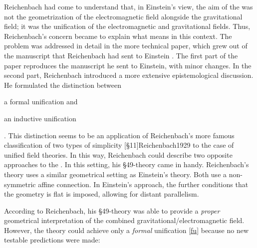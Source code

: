 \documentclass[draft]{article}
\begin{document}
Reichenbach had come to understand that, in Einstein's view, the aim of the \uftp was not the geometrization of the electromagnetic field alongside the gravitational field; it was the unification of the electromagnetic and gravitational fields. Thus, Reichenbach's concern became to explain what  means in this context. The problem was addressed in detail in the more technical paper, which grew out of the manuscript that Reichenbach had sent to Einstein \citep{Reichenbach1929a}. The first part of the paper reproduces the manuscript he sent to Einstein, with minor changes. In the second part, Reichenbach introduced a more extensive epistemological discussion. He formulated the distinction between  \begin{inparaenum}[(a)]
\item \label{fu} a formal unification and \item \label{iu} an inductive unification
\end{inparaenum}. This distinction seems to be an application of  Reichenbach's more famous classification of two types of simplicity [\S11]{Reichenbach1929} to the case of unified field theories. In this way, Reichenbach could describe two opposite approaches to the \uftp. In this setting, his \S49-theory came in handy. Reichenbach's theory uses a similar geometrical setting as Einstein's theory. Both use a non-symmetric affine connection. In Einstein's approach, the further conditions that the geometry is flat is imposed, allowing for distant parallelism.

According to Reichenbach, his \S49-theory was able to provide a \emph{proper} geometrical interpretation of the combined gravitational/electromagnetic field. However, the theory could achieve only a \emph{formal} unification \cref{fu} because no new testable predictions were made:
\end{document}
